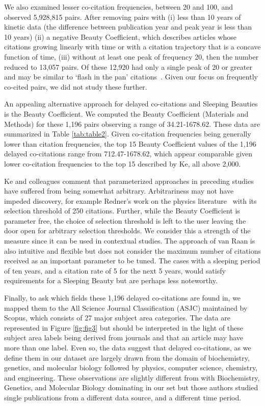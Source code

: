\documentclass[utf8]{frontiersSCNS}
\begin{document}
We also examined lesser co-citation frequencies, between 20 and 100, and observed 5,928,815 pairs. After removing pairs with (i) less than 10 years of kinetic data (the difference between publication year and peak year is less than 10 years) (ii) a negative Beauty Coefficient, which describes articles whose citations growing linearly with time or with a citation trajectory that is a concave function of time, (iii) without at least one peak of frequency 20, then the number reduced to 13,057 pairs. Of these 12,920 had only a single peak of 20 or greater and may be similar to `flash in the pan' citations~\citep{costas2010,Li2013CitationCO}. Given our focus on frequently co-cited pairs, we did not study these further.

An appealing alternative approach for delayed co-citations and Sleeping Beauties is the Beauty Coefficient. We computed the Beauty Coefficient (Materials and Methods) for these 1,196 pairs  observing a range of 34.21-1678.62. These data are summarized in Table \ref{tab:table2}.  Given co-citation frequencies being generally lower than citation frequencies, the top 15 Beauty Coefficient values of the 1,196 delayed co-citations range from 712.47-1678.62, which appear comparable given lower co-citation frequencies to the top 15 described by Ke, all above 2,000.

Ke and colleagues comment that parameterized approaches in preceding studies have suffered from being somewhat arbitrary. Arbitrariness may not have impeded discovery, for example Redner's work on the physics literature~\citep{redner_2005} with its selection threshold of 250 citations. Further, while the Beauty Coefficient is parameter free, the choice of selection threshold is left to the user leaving the door open for arbitrary selection thresholds. We consider this a strength of the measure since it can be used in contextual studies. The approach of van Raan is also intuitive and flexible but does not consider the maximum number of citations received as an important parameter to be tuned.  The cases with a sleeping period of ten years, and a citation rate of 5 for the next 5 years, would satisfy requirements for a Sleeping Beauty but are perhaps less noteworthy.

Finally, to ask which fields these 1,196 delayed co-citations are found in, we mapped them to the All Science Journal Classification (ASJC) maintained by Scopus, which consists of 27 major subject area categories.  The data are represented in Figure \ref{fig:fig3} but should be interpreted in the light of these subject area labels being derived from journals and that an article may have more than one label. Even so, the data suggest that delayed co-citations, as we define them in our dataset are largely drawn from the domain of biochemistry, genetics, and molecular biology followed by physics, computer science, chemistry, and engineering. These observations are slightly different from \cite[Fig~4]{Ke2015} with Biochemistry, Genetics, and Molecular Biology dominating in our set but those authors studied single publications from a different data source, and a different time period. 
\end{document}
